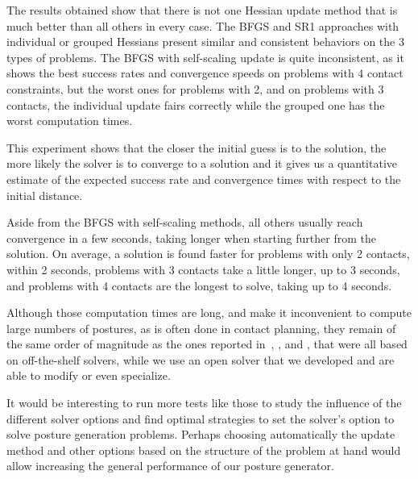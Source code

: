 The results obtained show that there is not one Hessian update method that is much better than all others in every case.
The BFGS and SR1 approaches with individual or grouped Hessians present similar and consistent behaviors on the 3 types of problems.
The BFGS with self-scaling update is quite inconsistent, as it shows the best success rates and convergence speeds on problems with 4 contact constraints, but the worst ones for problems with 2, and on problems with 3 contacts, the individual update fairs correctly while the grouped one has the worst computation times.

This experiment shows that the closer the initial guess is to the solution, the more likely the solver is to converge to a solution and it gives us a quantitative estimate of the expected success rate and convergence times with respect to the initial distance.

Aside from the BFGS with self-scaling methods, all others usually reach convergence in a few seconds, taking longer when starting further from the solution.
On average, a solution is found faster for problems with only 2 contacts, within 2 seconds, problems with 3 contacts take a little longer, up to 3 seconds, and problems with 4 contacts are the longest to solve, taking up to 4 seconds.

Although those computation times are long, and make it inconvenient to compute large numbers of postures, as is often done in contact planning, they remain of the same order of magnitude as the ones reported in~\cite{brossette:RAM:2013}, \cite{escande:iros:2006}, \cite{bouyarmane2011autonomous} and \cite{hauser:ijrr:2008}, that were all based on off-the-shelf solvers, while we use an open solver that we developed and are able to modify or even specialize.

It would be interesting to run more tests like those to study the influence of the different solver options and find optimal strategies to set the solver's option to solve posture generation problems.
Perhaps choosing automatically the update method and other options based on the structure of the problem at hand would allow increasing the general performance of our posture generator.

